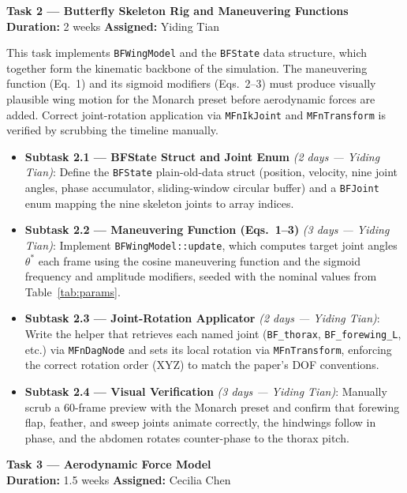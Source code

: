 \documentclass[12pt]{article}
\begin{document}
\bigskip
\noindent\textbf{Task 2 --- Butterfly Skeleton Rig and Maneuvering Functions}\\
\textbf{Duration:} 2 weeks \quad \textbf{Assigned:} Yiding Tian

This task implements \texttt{BFWingModel} and the \texttt{BFState} data structure,
which together form the kinematic backbone of the simulation. The maneuvering
function (Eq.~1) and its sigmoid modifiers (Eqs.~2--3) must produce visually
plausible wing motion for the Monarch preset before aerodynamic forces are added.
Correct joint-rotation application via \texttt{MFnIkJoint} and \texttt{MFnTransform}
is verified by scrubbing the timeline manually.

\begin{itemize}
  \item \textbf{Subtask 2.1 --- BFState Struct and Joint Enum} \textit{(2 days --- Yiding Tian)}: Define the
    \texttt{BFState} plain-old-data struct (position, velocity, nine joint angles,
    phase accumulator, sliding-window circular buffer) and a \texttt{BFJoint} enum
    mapping the nine skeleton joints to array indices.
  \item \textbf{Subtask 2.2 --- Maneuvering Function (Eqs.~1--3)} \textit{(3 days --- Yiding Tian)}: Implement
    \texttt{BFWingModel::update}, which computes target joint angles $\theta^*$ each
    frame using the cosine maneuvering function and the sigmoid frequency and
    amplitude modifiers, seeded with the nominal values from
    Table~\ref{tab:params}.
  \item \textbf{Subtask 2.3 --- Joint-Rotation Applicator} \textit{(2 days --- Yiding Tian)}: Write the helper that
    retrieves each named joint (\texttt{BF\_thorax}, \texttt{BF\_forewing\_L}, etc.)
    via \texttt{MFnDagNode} and sets its local rotation via \texttt{MFnTransform},
    enforcing the correct rotation order (XYZ) to match the paper's DOF conventions.
  \item \textbf{Subtask 2.4 --- Visual Verification} \textit{(3 days --- Yiding Tian)}: Manually scrub a 60-frame
    preview with the Monarch preset and confirm that forewing flap, feather, and
    sweep joints animate correctly, the hindwings follow in phase, and the abdomen
    rotates counter-phase to the thorax pitch.
\end{itemize}

\bigskip
\noindent\textbf{Task 3 --- Aerodynamic Force Model}\\
\textbf{Duration:} 1.5 weeks \quad \textbf{Assigned:} Cecilia Chen
\end{document}
